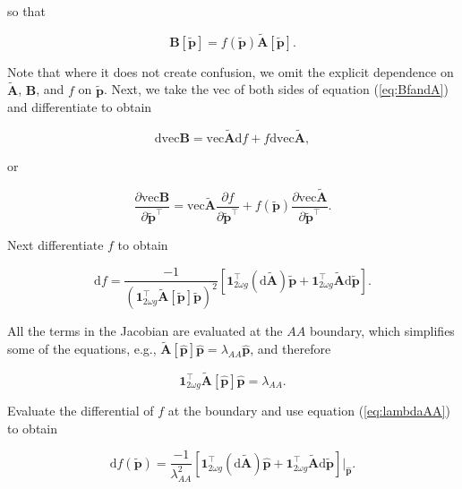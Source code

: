 \documentclass[11pt]{article}
\def\mbf#1{\mathbf{#1}}
\begin{document}
\noindent so that

\begin{equation}
	\mbf{B}[\tilde{\mbf{p}}] = f(\tilde{\mbf{p}}) \tilde{\mbf{A}}[\tilde{\mbf{p}}]. \label{eq:BfandA}
\end{equation}

\noindent Note that where it does not create confusion, we omit the explicit dependence on $\tilde{\mbf{A}}$, $\mbf{B}$, and $f$ on $\tilde{\mbf{p}}$. Next, we take the vec of both sides of equation (\ref{eq:BfandA}) and differentiate to obtain

\begin{equation} \label{eq:dvecB}
	\text{dvec} \mbf{B} = \text{vec} \tilde{\mbf{A}} \text{d} f + f \text{dvec} \tilde{\mbf{A}},
\end{equation}

\noindent or

\begin{equation}
	\frac{\partial \text{vec} \mbf{B}} {\partial \tilde{\mbf{p}}^{\intercal}} = \text{vec} \tilde{\mbf{A}} \frac{\partial f}{\partial \tilde{\mbf{p}}^{\intercal} } + f(\tilde{\mbf{p}}) \frac{ \partial \text{vec} \tilde{\mbf{A}} }{ \partial \tilde{\mbf{p}}^{\intercal} }.
\end{equation}

\noindent Next differentiate $f$ to obtain

\begin{equation}
	\text{d} f = \frac{ -1 }{ \left( \mbf{1}^{\intercal}_{2 \omega g} \tilde{\mbf{A}}[\tilde{\mbf{p}}] \tilde{\mbf{p}} \right)^2 } \left[ \mbf{1}^{\intercal}_{2 \omega g} \left( \text{d} \tilde{\mbf{A}} \right) \tilde{\mbf{p}} + \mbf{1}^{\intercal}_{2 \omega g} \tilde{\mbf{A}} \text{d} \tilde{\mbf{p}} \right].
\end{equation}

\noindent All the terms in the Jacobian are evaluated at the $AA$ boundary, which simplifies some of the equations, e.g., $\tilde{\mbf{A}}[ \hat{\mbf{p}} ] \hat{\mbf{p}} = \lambda_{AA} \hat{\mbf{p}}$, and therefore 

\begin{equation} \label{eq:lambdaAA}
	\mbf{1}^{\intercal}_{2 \omega g} \tilde{\mbf{A}}[\hat{\mbf{p}}] \hat{\mbf{p}} = \lambda_{AA}.
\end{equation}

Evaluate the differential of $f$ at the boundary and use equation (\ref{eq:lambdaAA}) to obtain

\begin{equation} \label{eq:df}
	\text{d} f(\tilde{\mbf{p}}) = \frac{ -1 }{\lambda_{AA}^2 } \left[ \mbf{1}^{\intercal}_{2 \omega g} \left( \text{d} \tilde{\mbf{A}} \right) \hat{\mbf{p}} + \mbf{1}^{\intercal}_{2 \omega g} \tilde{\mbf{A}} \text{d} \tilde{\mbf{p}} \right] \bigg\rvert_{\hat{\mbf{p}}}.
\end{equation}
\end{document}
